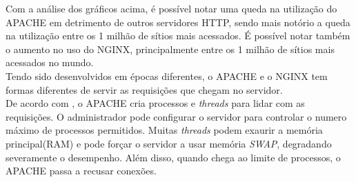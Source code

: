 Com a análise dos gráficos acima, é possível notar uma queda na utilização do APACHE em detrimento de outros servidores HTTP, sendo mais notório a queda na utilização entre os 1 milhão de sítios mais acessados. É possível notar também o aumento no uso do NGINX, principalmente entre os 1 milhão de sítios mais acessados no mundo.\\
Tendo sido desenvolvidos em épocas diferentes, o APACHE e o NGINX tem formas diferentes de servir as requisições que chegam no servidor.\\
De acordo com \cite{rowe}, o APACHE cria processos e \textit{threads} para lidar com as requisições. O administrador pode configurar o servidor para controlar o numero máximo de processos permitidos. Muitas \textit{threads} podem exaurir a memória principal(RAM) e pode forçar o servidor a usar memória \textit{SWAP}, degradando severamente o desempenho. Além disso, quando chega ao limite de processos, o APACHE passa a recusar conexões.